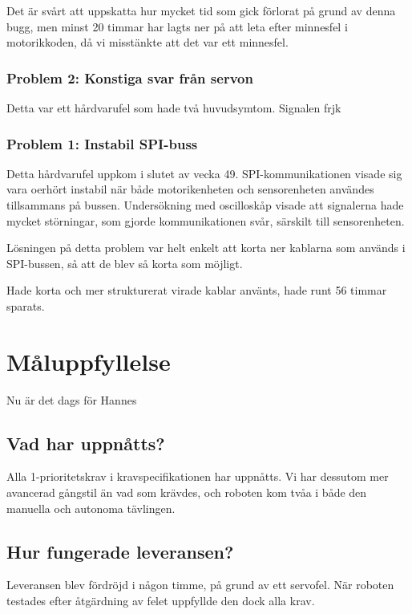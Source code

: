 \documentclass[a4paper,titlepage,12pt]{article}
\begin{document}
    Det är svårt att uppskatta hur mycket tid som gick förlorat på grund av
    denna bugg, men minst 20 timmar har lagts ner på att leta efter minnesfel i
    motorikkoden, då vi misstänkte att det var ett minnesfel.

    \subsubsection{Problem 2: Konstiga svar från servon}

    Detta var ett hårdvarufel som hade två huvudsymtom. Signalen frjk

    \subsubsection{Problem 1: Instabil SPI-buss}

    Detta hårdvarufel uppkom i slutet av vecka 49. SPI-kommunikationen visade
    sig vara oerhört instabil när både motorikenheten och sensorenheten
    användes tillsammans på bussen. Undersökning med oscilloskåp visade att
    signalerna hade mycket störningar, som gjorde kommunikationen svår,
    särskilt till sensorenheten.

    Lösningen på detta problem var helt enkelt att korta ner kablarna som
    används i SPI-bussen, så att de blev så korta som möjligt.

    Hade korta och mer strukturerat virade kablar använts, hade runt 56 timmar
    sparats. %

	\section{Måluppfyllelse}
	Nu är det dags för Hannes
	
	\subsection{Vad har uppnåtts?}
    Alla 1-prioritetskrav i kravspecifikationen har uppnåtts. Vi har dessutom
    mer avancerad gångstil än vad som krävdes, och roboten kom tvåa i både den
    manuella och autonoma tävlingen.
	
	\subsection{Hur fungerade leveransen?}
    Leveransen blev fördröjd i någon timme, på grund av ett servofel. När
    roboten testades efter åtgärdning av felet uppfyllde den dock alla krav.
\end{document}
